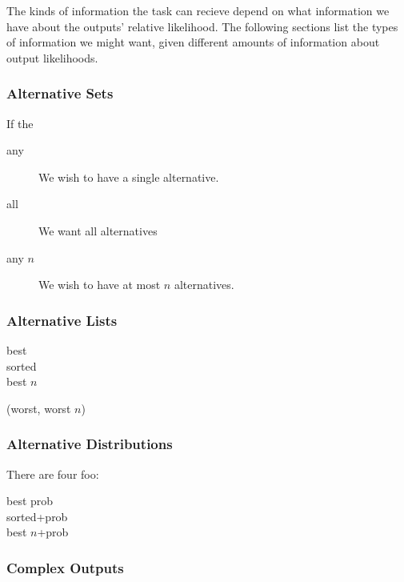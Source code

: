 \documentclass[11pt]{article}
\begin{document}
    The kinds of information the task can recieve depend on what
    information we have about the outputs' relative likelihood.  The
    following sections list the types of information we might want,
    given different amounts of information about output likelihoods.

    \subsubsection{Alternative Sets}

      If the 

      \begin{description}
        \item[any] We wish to have a single alternative.
        \item[all] We want all alternatives
        \item[any $n$] We wish to have at most $n$ alternatives.
      \end{description}

    \subsubsection{Alternative Lists}

      \begin{description}
        \item[best]
        \item[sorted]
        \item[best $n$]
      \end{description}

      (worst, worst $n$)

    \subsubsection{Alternative Distributions}


      There are four foo:

      \begin{description}
        \item[best prob]
        \item[sorted+prob]
        \item[best $n$+prob]
      \end{description}


    \subsubsection{Complex Outputs}
\end{document}
